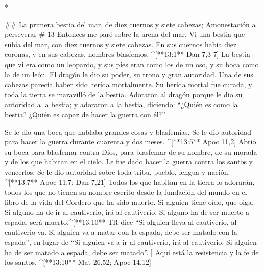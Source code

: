 \begin{paracols}{2}
\begin{english}
\end{english}
\switchcolumn[0]*

## La primera bestia del mar, de diez cuernos y siete cabezas; Amonestación a perseverar
# 13
 Entonces me paré sobre la arena del mar. Vi una bestia que subía del mar, con diez cuernos y siete cabezas. En sus cuernos había diez coronas, y en sus cabezas, nombres blasfemos. ^[**13:1** Dan 7,3-7]  La bestia que vi era como un leopardo, y sus pies eran como los de un oso, y su boca como la de un león. El dragón le dio su poder, su trono y gran autoridad.  Una de sus cabezas parecía haber sido herida mortalmente. Su herida mortal fue curada, y toda la tierra se maravilló de la bestia.  Adoraron al dragón porque le dio su autoridad a la bestia; y adoraron a la bestia, diciendo: “¿Quién es como la bestia? ¿Quién es capaz de hacer la guerra con él?”

 Se le dio una boca que hablaba grandes cosas y blasfemias. Se le dio autoridad para hacer la guerra durante cuarenta y dos meses. ^[**13:5** Apoc 11,2]  Abrió su boca para blasfemar contra Dios, para blasfemar de su nombre, de su morada y de los que habitan en el cielo.  Le fue dado hacer la guerra contra los santos y vencerlos. Se le dio autoridad sobre toda tribu, pueblo, lengua y nación. ^[**13:7** Apoc 11,7; Dan 7,21]  Todos los que habitan en la tierra lo adorarán, todos los que no tienen su nombre escrito desde la fundación del mundo en el libro de la vida del Cordero que ha sido muerto.  Si alguien tiene oído, que oiga.  Si alguno ha de ir al cautiverio, irá al cautiverio. Si alguno ha de ser muerto a espada, será muerto.^[**13:10** TR dice “Si alguien lleva al cautiverio, al cautiverio va. Si alguien va a matar con la espada, debe ser matado con la espada”, en lugar de “Si alguien va a ir al cautiverio, irá al cautiverio. Si alguien ha de ser matado a espada, debe ser matado”. ] Aquí está la resistencia y la fe de los santos. ^[**13:10** Mat 26,52; Apoc 14,12]


\end{paracols}

